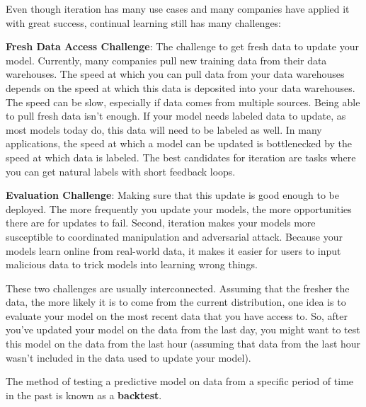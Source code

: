 Even though iteration has many use cases and many companies have applied it with great success, continual
learning still has many challenges:
\bit
\item \textbf{Fresh Data Access Challenge}: The challenge to get fresh data to update your model. Currently, many
companies pull new training data from their data warehouses. The speed at which you can pull data from your data
warehouses depends on the speed at which this data is deposited into your data warehouses. The speed can be slow,
especially if data comes from multiple sources. Being able to pull fresh data isn't enough. If your model needs
labeled data to update, as most models today do, this data will need to be labeled as well. In many applications, the
speed at which a model can be updated is bottlenecked by the speed at which data is labeled. The best candidates for
iteration are tasks where you can get natural labels with short feedback loops.
\item \textbf{Evaluation Challenge}: Making sure that this update is good enough to be deployed. The more frequently
you update your models, the more opportunities there are for updates to fail. Second, iteration makes your
models more susceptible to coordinated manipulation and adversarial attack. Because your models learn online from
real-world data, it makes it easier for users to input malicious data to trick models into learning wrong things.
\eit

These two challenges are usually interconnected. Assuming that the fresher the data, the more likely it is to come
from the current distribution, one idea is to evaluate your model on the most recent data that you have access to. So,
after you've updated your model on the data from the last day, you might want to test this model on the data from the
last hour (assuming that data from the last hour wasn't included in the data used to update your model).

\bd[Backtest]
The method of testing a predictive model on data from a specific period of time in the past is known as a
\textbf{backtest}.
\ed

